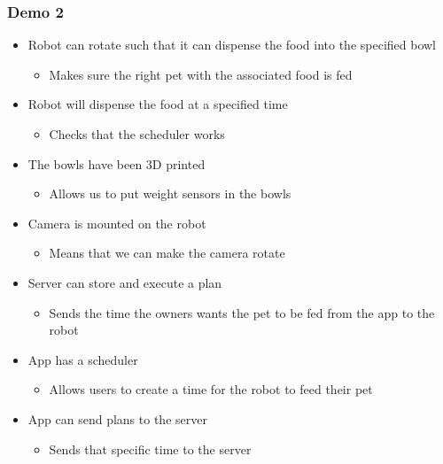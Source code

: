         \subsubsection{Demo 2}
        \begin{itemize}
        \setlength{\itemindent}{.2in}
            \item Robot can rotate such that it can dispense the food into the specified bowl 
                \begin{itemize} 
                    \setlength{\itemindent}{.3in}
                    \item Makes sure the right pet with the associated food is fed 
                \end{itemize}
            \item Robot will dispense the food at a specified time
                \begin{itemize}
                    \setlength{\itemindent}{.3in}
                    \item Checks that the scheduler works 
                \end{itemize}
            \item The bowls have been 3D printed
                \begin{itemize}
                    \setlength{\itemindent}{.3in}
                    \item Allows us to put weight sensors in the bowls
                \end{itemize}
            \item Camera is mounted on the robot
                \begin{itemize}
                    \setlength{\itemindent}{.3in}
                    \item Means that we can make the camera rotate
                \end{itemize}
            \item Server can store and execute a plan
                \begin{itemize}
                    \setlength{\itemindent}{.3in}
                    \item Sends the time the owners wants the pet to be fed from the app to the robot
                \end{itemize}
            \item App has a scheduler
                \begin{itemize}
                    \setlength{\itemindent}{.3in}
                    \item Allows users to create a time for the robot to feed their pet
                \end{itemize}
            \item App can send plans to the server
                \begin{itemize}
                    \setlength{\itemindent}{.3in}
                    \item Sends that specific time to the server 
                \end{itemize}
        \end{itemize}
